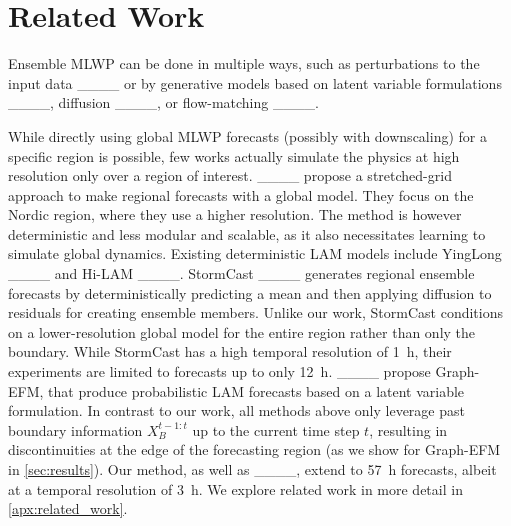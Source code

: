 \section{Related Work}
Ensemble MLWP can be done in multiple ways, such as perturbations to the input data ____ or by generative models based on latent variable formulations ____, diffusion ____, or flow-matching ____.

While directly using global MLWP forecasts (possibly with downscaling) for a specific region is possible, few works actually simulate the physics at high resolution only over a region of interest.
____ propose a stretched-grid approach to make regional forecasts with a global model. They focus on the Nordic region, where they use a higher resolution. 
The method is however deterministic and less modular and scalable, as it also necessitates learning to simulate global dynamics.
Existing deterministic LAM models include YingLong ____ and Hi-LAM ____.
StormCast ____ generates regional ensemble forecasts by deterministically predicting a mean and then applying diffusion to residuals for creating ensemble members. Unlike our work, StormCast conditions on a lower-resolution global model for the entire region rather than only the boundary. While StormCast has a high temporal resolution of \SI{1}{\hour}, their experiments are limited to forecasts up to only \SI{12}{\hour}.
____ propose Graph-EFM, that produce probabilistic LAM forecasts based on a latent variable formulation. In contrast to our work, all methods above only leverage past boundary information $X^{t-1:t}_B$ up to the current time step $t$, resulting in discontinuities at the edge of the forecasting region (as we show for Graph-EFM in \cref{sec:results}). 
Our method, as well as ____, extend to \SI{57}{\hour} forecasts, albeit at a temporal resolution of \SI{3}{\hour}. We explore related work in more detail in \cref{apx:related_work}.
